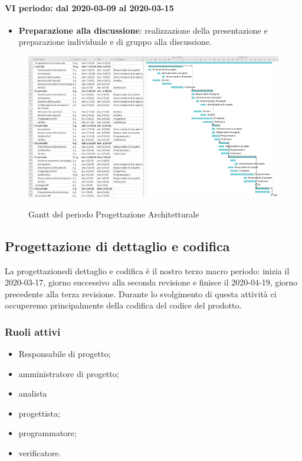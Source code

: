 \paragraph*{VI periodo: dal 2020-03-09 al 2020-03-15}
\begin{itemize}
	\item \textbf{Preparazione alla discussione}: realizzazione della presentazione e preparazione individuale e di gruppo alla discussione.
\end{itemize}

\begin{landscape}
	\begin{figure}[H] 	
		\includegraphics[width=\linewidth]{./gantt/Progettazione_architetturale_datax2.png}	\\
		\caption{Gantt del periodo Progettazione Architetturale}	
	\end{figure}
\end{landscape}


\subsection{Progettazione di dettaglio e codifica}
La progettazione\glosp di dettaglio e codifica è il nostro terzo macro periodo: inizia il 2020-03-17, giorno successivo alla seconda revisione e finisce il 2020-04-19, giorno precedente alla terza revisione. Durante lo svolgimento di questa attività ci occuperemo principalmente della codifica del codice del prodotto\glo.

\subsubsection{Ruoli attivi}
\begin{itemize}
	\item Responsabile di progetto\glo;
	\item amministratore di progetto\glo;
	\item analista
	\item progettista;
	\item programmatore;
	\item verificatore.
\end{itemize}

